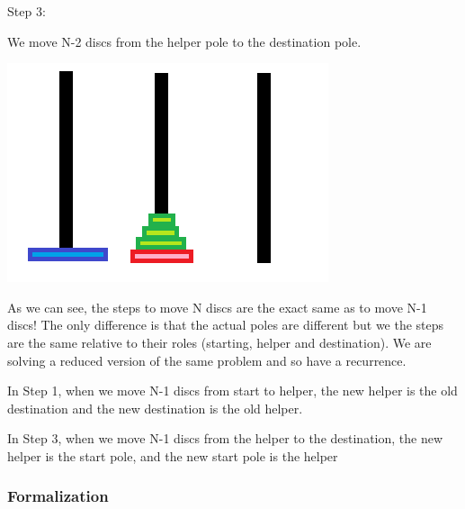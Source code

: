 \documentclass[11pt,oneside]{book}
\makeatletter
\def\maxwidth#1{\ifdim\Gin@nat@width>#1 #1\else\Gin@nat@width\fi}
\makeatother
\begin{document}
Step 3:

We move N-2 discs from the helper pole to the destination pole.

\vspace{5px}\includegraphics[width=\maxwidth{\textwidth}]{hanoi2.png}

As we can see, the steps to move N discs are the exact same as to move N-1 discs! The only difference is that the actual poles are different but we the steps are the same relative to their roles (starting, helper and destination). We are solving a reduced version of the same problem and so have a recurrence.

In Step 1, when we move N-1 discs from start to helper, the new helper is the old destination and the new destination is the old helper.

In Step 3, when we move N-1 discs from the helper to the destination, the new helper is the start pole, and the new start pole is the helper

\subsubsection{Formalization}
\end{document}
